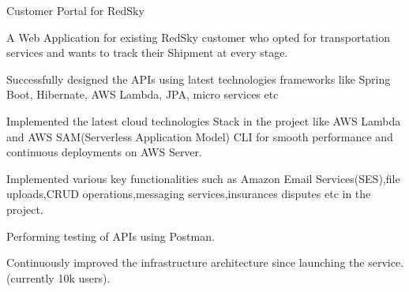 

\begin{cventries}

  \cventry
    {} %
    {Customer Portal for RedSky} %
    {} %
    {} %
    {
      \begin{cvitems} %
        \item {A Web Application for existing RedSky customer who opted for transportation services and wants to track their Shipment at every stage.}
        \item {Successfully designed the APIs using latest technologies frameworks like Spring Boot, Hibernate, AWS Lambda, JPA, micro services etc}        
        \item {Implemented the latest cloud technologies Stack in the project like AWS Lambda and AWS SAM(Serverless Application Model) CLI  for smooth performance and continuous deployments on AWS Server.}
        \item {Implemented various key functionalities such as Amazon Email Services(SES),file uploads,CRUD operations,messaging services,insurances disputes etc in the project.}
        \item {Performing testing of APIs using Postman.}
        \item {Continuously improved the infrastructure architecture since launching the service. (currently 10k users).}        
      \end{cvitems}
    }

  
\end{cventries}
